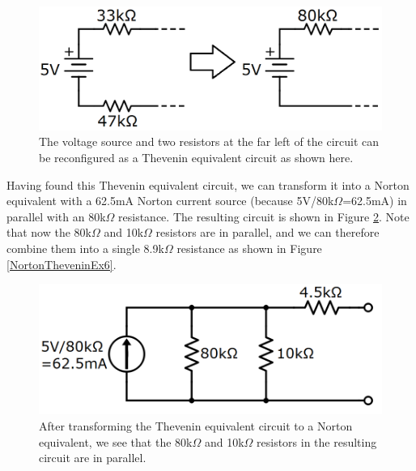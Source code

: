 \begin{figure}[h!]
\centering
\includegraphics[width=15cm]{figures/nortThevEx_4.png}
\caption{The voltage source and two resistors at the far left of the circuit can be reconfigured as a Thevenin equivalent circuit as shown here.}
\label{NortonTheveninEx4}
\end{figure}
\par
Having found this Thevenin equivalent circuit, we can transform it into a Norton equivalent with a 62.5mA Norton current source (because 5V/80k$\Omega$=62.5mA) in parallel with an 80k$\Omega$ resistance. The resulting circuit is shown in Figure \ref{NortonTheveninEx5}. Note that now the 80k$\Omega$ and 10k$\Omega$ resistors are in parallel, and we can therefore combine them into a single 8.9k$\Omega$ resistance as shown in Figure \ref{NortonTheveninEx6}.
\begin{figure}[h!]
\centering
\includegraphics[width=15cm]{figures/nortThevEx_5.png}
\caption{After transforming the Thevenin equivalent circuit to a Norton equivalent, we see that the 80k$\Omega$ and 10k$\Omega$ resistors in the resulting circuit are in parallel.}
\label{NortonTheveninEx5}
\end{figure}

